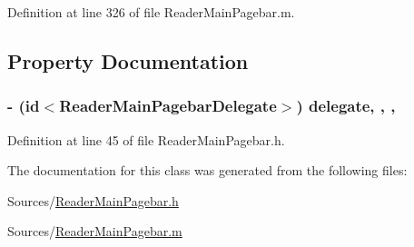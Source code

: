 Definition at line 326 of file Reader\-Main\-Pagebar.\-m.



\subsection{Property Documentation}
\hypertarget{interface_reader_main_pagebar_a12d550b5c0842cbda05b7d1d65579639}{
\subsubsection[{delegate}]{\setlength{\rightskip}{0pt plus 5cm}-\/ (id$<${\bf Reader\-Main\-Pagebar\-Delegate}$>$) delegate\hspace{0.3cm}{\ttfamily [read]}, {\ttfamily [write]}, {\ttfamily [nonatomic]}, {}}}\label{dc/d4a/interface_reader_main_pagebar_a12d550b5c0842cbda05b7d1d65579639}


Definition at line 45 of file Reader\-Main\-Pagebar.\-h.



The documentation for this class was generated from the following files\-:\begin{DoxyCompactItemize}
\item 
Sources/\hyperlink{_reader_main_pagebar_8h}{Reader\-Main\-Pagebar.\-h}\item 
Sources/\hyperlink{_reader_main_pagebar_8m}{Reader\-Main\-Pagebar.\-m}\end{DoxyCompactItemize}
